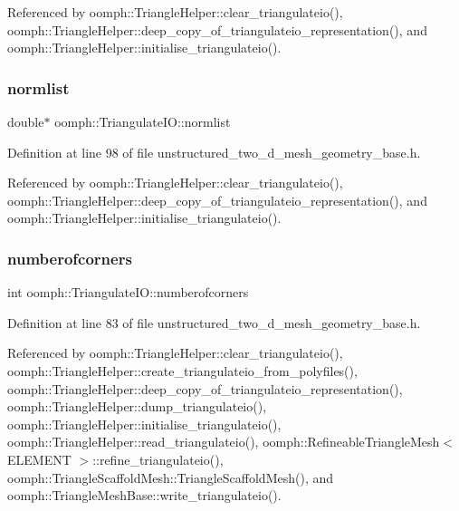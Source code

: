 Referenced by oomph\+::\+Triangle\+Helper\+::clear\+\_\+triangulateio(), oomph\+::\+Triangle\+Helper\+::deep\+\_\+copy\+\_\+of\+\_\+triangulateio\+\_\+representation(), and oomph\+::\+Triangle\+Helper\+::initialise\+\_\+triangulateio().

\mbox{\label{structoomph_1_1TriangulateIO_aaee7350c5c3ac8105643724ae5455823}} 
\subsubsection{\texorpdfstring{normlist}{normlist}}
{\footnotesize\ttfamily double$\ast$ oomph\+::\+Triangulate\+I\+O\+::normlist}



Definition at line 98 of file unstructured\+\_\+two\+\_\+d\+\_\+mesh\+\_\+geometry\+\_\+base.\+h.



Referenced by oomph\+::\+Triangle\+Helper\+::clear\+\_\+triangulateio(), oomph\+::\+Triangle\+Helper\+::deep\+\_\+copy\+\_\+of\+\_\+triangulateio\+\_\+representation(), and oomph\+::\+Triangle\+Helper\+::initialise\+\_\+triangulateio().

\mbox{\label{structoomph_1_1TriangulateIO_adc650f3a1adb293757fe9877c68bdc67}} 
\subsubsection{\texorpdfstring{numberofcorners}{numberofcorners}}
{\footnotesize\ttfamily int oomph\+::\+Triangulate\+I\+O\+::numberofcorners}



Definition at line 83 of file unstructured\+\_\+two\+\_\+d\+\_\+mesh\+\_\+geometry\+\_\+base.\+h.



Referenced by oomph\+::\+Triangle\+Helper\+::clear\+\_\+triangulateio(), oomph\+::\+Triangle\+Helper\+::create\+\_\+triangulateio\+\_\+from\+\_\+polyfiles(), oomph\+::\+Triangle\+Helper\+::deep\+\_\+copy\+\_\+of\+\_\+triangulateio\+\_\+representation(), oomph\+::\+Triangle\+Helper\+::dump\+\_\+triangulateio(), oomph\+::\+Triangle\+Helper\+::initialise\+\_\+triangulateio(), oomph\+::\+Triangle\+Helper\+::read\+\_\+triangulateio(), oomph\+::\+Refineable\+Triangle\+Mesh$<$ E\+L\+E\+M\+E\+N\+T $>$\+::refine\+\_\+triangulateio(), oomph\+::\+Triangle\+Scaffold\+Mesh\+::\+Triangle\+Scaffold\+Mesh(), and oomph\+::\+Triangle\+Mesh\+Base\+::write\+\_\+triangulateio().

